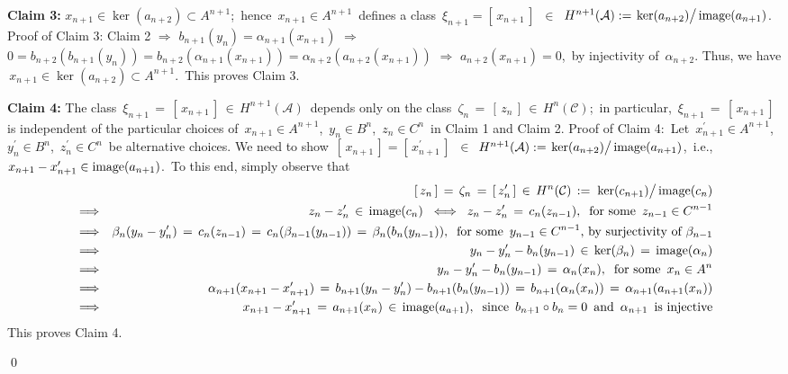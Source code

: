 \vskip 0.5cm
\noindent
\textbf{Claim 3:}\;\;
$x_{n+1} \in  \ker(a_{n+2}) \subset A^{n+1}$;\,
hence \,$x_{n+1} \in A^{n+1}$\, defines a class
\,$\xi_{n+1} = \left[\,x_{n+1}\,\right]$\,
$\in$
\,$H^{n+1}(\mathcal{A}) := \left.\ker(\overset{{\color{white}.}}{a_{n+2}})\right/\image(a_{n+1})$.\,
\vskip 0.2cm
\noindent
Proof of Claim 3:
Claim 2
\;$\Longrightarrow$\;
$b_{n+1}(y_{n}) = \alpha_{n+1}(x_{n+1})$
\;$\Longrightarrow$\;
$0 = b_{n+2}(b_{n+1}(y_{n})) = b_{n+2}(\alpha_{n+1}(x_{n+1})) = \alpha_{n+2}(a_{n+2}(x_{n+1}))$
\;$\Longrightarrow$\;
$a_{n+2}(x_{n+1}) = 0$,\, by injectivity of \,$\alpha_{n+2}$.
Thus, we have \,$x_{n+1} \in  \ker(a_{n+2}) \subset A^{n+1}$.\,
This proves Claim 3. 

\vskip 0.5cm
\noindent
\textbf{Claim 4:}\;\;
The class
\,$\xi_{n+1} \,=\, \left[\,x_{n+1}\,\right] \,\in\, H^{n+1}(\mathcal{A})$\,
depends only on the class
\,$\zeta_{n} \,=\, \left[\,z_{n}\,\right] \,\in\, H^{n}(\mathcal{C})$;\,
in particular,
\,$\xi_{n+1} \,=\, \left[\,x_{n+1}\,\right]$\,
is independent of the particular choices of
\,$x_{n+1} \in A^{n+1}$,\, $y_{n} \in B^{n}$,\, $z_{n} \in C^{n}$\,
in Claim 1 and Claim 2.
\vskip 0.2cm
\noindent
Proof of Claim 4:\,
Let
\,$x_{n+1}^{\prime} \in A^{n+1}$,
\,$y_{n}^{\prime} \in B^{n}$,
\,$z_{n}^{\prime} \in C^{n}$\,
be alternative choices.
We need to show
\,$\left[\,x_{n+1}\,\right] = \left[\,x_{n+1}^{\prime}\,\right]$\,
$\in$
\,$H^{n+1}(\mathcal{A}) := \left.\ker(\overset{{\color{white}.}}{a_{n+2}})\right/\image(a_{n+1})$,\,
i.e.,
\,$x_{n+1} - x_{n+1}^{\prime} \in \textnormal{image}(a_{n+1})$.\,
To this end, simply observe that
\begin{eqnarray*}
&&
	\left[\,z_{n}\,\right] \,=\, \zeta_{n} \,=\, \left[\,z_{n}^{\prime}\,\right]
	\,\in\,
		H^{n}(\mathcal{C}) \,:=\, \left.\ker(\overset{{\color{white}.}}{c_{n+1}})\right/\image(c_{n})
\\
& \Longrightarrow &
	z_{n} - z_{n}^{\prime} \,\in\, \image(c_{n})
\;\; \Longleftrightarrow \;\;
	z_{n} - z_{n}^{\prime} \,=\, c_{n}(z_{n-1}),
	\;\;
	\textnormal{for some \,$z_{n-1} \in C^{n-1}$}
\\
& \Longrightarrow &
	\beta_{n}(y_{n} - y_{n}^{\prime}) \,=\, c_{n}(z_{n-1}) \,=\, c_{n}(\beta_{n-1}(y_{n-1})) \,=\, \beta_{n}(b_{n}(y_{n-1})),
	\;\;
	\textnormal{for some \,$y_{n-1} \in C^{n-1}$, by surjectivity of $\beta_{n-1}$}
\\
& \Longrightarrow &
	y_{n} - y_{n}^{\prime} - b_{n}(y_{n-1}) \,\in\, \ker(\beta_{n}) \,=\, \image(\alpha_{n})
\\
& \Longrightarrow &
	y_{n} - y_{n}^{\prime} - b_{n}(y_{n-1}) \,=\, \alpha_{n}(x_{n}),
	\;\;
	\textnormal{for some \,$x_{n} \in A^{n}$}
\\
& \Longrightarrow &
	\alpha_{n+1}(x_{n+1} - x_{n+1}^{\prime})
	\,=\,
		b_{n+1}(y_{n} - y_{n}^{\prime}) - b_{n+1}(b_{n}(y_{n-1}))
	\,=\,
		b_{n+1}(\alpha_{n}(x_{n}))
	\,=\,
		\alpha_{n+1}(a_{n+1}(x_{n}))
\\
& \Longrightarrow &
	x_{n+1} - x_{n+1}^{\prime} \,=\, a_{n+1}(x_{n}) \,\in\, \image(a_{a+1}),
	\;\;
	\textnormal{since \,$b_{n+1} \circ b_{n} = 0$\, and \,$\alpha_{n+1}$\, is injective}
\end{eqnarray*}
This proves Claim 4.

\qed


